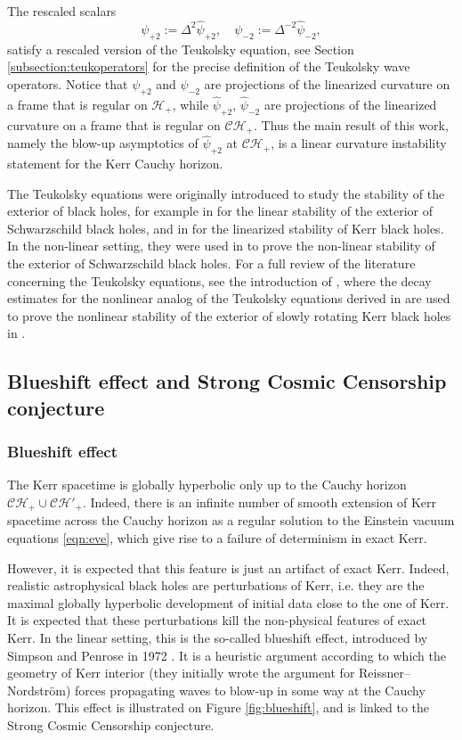 \documentclass[reqno]{amsart}
\numberwithin{equation}{section}
\newcommand{\mch}{\mathcal{H}}
\newcommand{\ch}{\mathcal{CH_+}}
\newcommand{\Psihat}{\widehat{\psi}}
\newcommand{\psihat}{\widehat{\psi}}
\newcommand{\psip}{\psi_{+2}}
\newcommand{\psim}{\psi_{-2}}
\newcommand{\psihatp}{\psihat_{+2}}
\newcommand{\psihatm}{\Psihat_{-2}}
\theoremstyle{plain}
\theoremstyle{definition}
\theoremstyle{remark}
\numberwithin{equation}{section}
\begin{document}
The rescaled scalars 
$$\psip:=\Delta^2\psihatp,\quad\psim:=\Delta^{-2}\psihatm,$$
satisfy a rescaled version of the Teukolsky equation, see Section \ref{subsection:teukoperators} for the precise definition of the Teukolsky wave operators. Notice that $\psip$ and $\psim$ are projections of the linearized curvature on a frame that is regular on $\mch_+$, while $\psihatp$, $\psihatm$ are projections of the linearized curvature on a frame that is regular on $\ch$. Thus the main result of this work, namely the blow-up asymptotics of $\psihatp$ at $\ch$, is a linear curvature instability statement for the Kerr Cauchy horizon.

{The Teukolsky equations were originally introduced to study the stability of the exterior of black holes, for example in \cite{schlinDHR} for the linear stability of the exterior of Schwarzschild black holes, and in \cite{mamorawetz, mablueandersson} for the linearized stability of Kerr black holes. In the non-linear setting, they were used in \cite{schpolarized, schNLDHRT} to prove the non-linear stability of the exterior of Schwarzschild black holes. }For a full review of the literature concerning the Teukolsky equations, see the introduction of \cite{KSwaveeq}, where the decay estimates for the nonlinear analog of the Teukolsky equations derived in \cite{KSwaveeq} are used to prove the nonlinear stability of the exterior of slowly rotating Kerr black holes in \cite{KS21}.

\subsection{Blueshift effect and Strong Cosmic Censorship conjecture}
\subsubsection{Blueshift effect}

The Kerr spacetime is globally hyperbolic only up to the Cauchy horizon $\ch\cup\mathcal{CH}'_+$. {Indeed, there is an infinite number of smooth extension of  Kerr spacetime across the Cauchy horizon as a regular solution to the Einstein vacuum equations \eqref{eqn:eve}, which give rise to a failure of determinism in exact Kerr.}

However, it is expected that this feature is just an {artifact} of exact Kerr. Indeed, realistic astrophysical black holes are perturbations of Kerr, i.e. they are the maximal globally hyperbolic development of initial data close to the one of Kerr. It is expected that these perturbations kill the non-physical features of exact Kerr. In the linear setting, this is the so-called blueshift effect, introduced by Simpson and Penrose in 1972 \cite{blueshift}. It is a heuristic argument according to which the geometry of Kerr interior (they initially wrote the argument for Reissner–Nordström) 
forces propagating waves to blow-up in some way at the Cauchy horizon. This effect is illustrated on Figure \ref{fig:blueshift}, and is linked to the Strong Cosmic Censorship conjecture.
\end{document}
